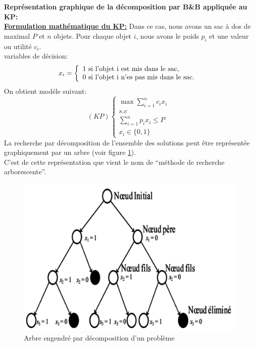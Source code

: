 \documentclass[a4paper,11pt,oneside]{report}
\theoremstyle{plain}
\newcommand{\0}{/ \! \! \! 0}
\theoremstyle{plain}
\begin{document}
  {\bf Repr\'esentation graphique de la d\'ecomposition par B\&B appliqu\'ee au KP:}\\
\underline{\bfseries Formulation math\'ematique du KP:} Dans ce cas, nous avons un sac \`a dos de maximal $P$ et $n$ objets. Pour chaque objet $i$, nous avons le poids $p_i$
 et une valeur ou utilit\'e $c_i$.\\
 variables de d\'ecision:
 $$
   x_i = \left \{ \begin{array}{l}
           1 \,\, \textnormal{si l'objet i est mis dans le sac,}\\
           0 \,\, \textnormal{si l'objet i n'es pas mis dans le sac.}
          \end{array}
          \right.
 $$
 On obtient mod\'ele suivant:
 \[
  (KP) \left \{\begin{array}{l}
          \max \displaystyle\sum_{i=1}^n c_i x_i \\
          s.c                        \\
          \displaystyle\sum_{i=1}^n p_i x_i \leq P \\
          x_i \in \{ 0, 1 \}
         \end{array}\right.
 \]
 La recherche par d\'ecomposition de l'ensemble des solutions peut \^etre repr\'esent\'ee graphiquement par un arbre (voir figure \ref{fig1}).\\
 C'est de cette repr\'esentation que vient le nom de ``m\'ethode de recherche arborescente''.
  \begin{figure}[h!]
  \begin{center}
  \includegraphics[scale=1]{fig1.png}
  \caption{\label{fig1} Arbre engendr\'e par d\'ecomposition d'un probl\`eme}
  \end{center}
  \end{figure}
\end{document}
